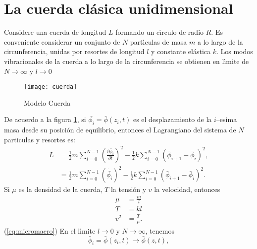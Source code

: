 
\section{La cuerda cl\'asica unidimensional}
\label{sec:la-cuerda-clasica}

\begin{frame}
Considere una cuerda de longitud $L$ formando un c\'\i rculo de radio $R$.
Es conveniente considerar un conjunto de $N$ part\'\i culas de masa $m$ a
lo largo de la circunferencia, unidas por resortes de longitud $l$ y
constante el\'astica $k$. Los modos vibracionales de la cuerda a lo
largo de la circunferencia se obtienen en l\'\i mite de $N\to\infty$ y $l\to0$ 

\begin{figure} %
  \centering %
  \texttt{[image: cuerda]} %
  \caption{Modelo Cuerda} %
  \label{fig:1string} %
\end{figure} %
De acuerdo a la figura 
\ref{fig:1string}, %
si $\bar{\phi_i}=\bar{\phi}(z_i,t)$ es el
desplazamiento de la $i$--esima masa desde su posici\'on de equilibrio,
entonces el Lagrangiano del sistema de $N$ particulas y resortes es:
\begin{align}
  \label{eq:1strLsum} %
  L&=\frac{1}{2}m\sum_{i=0}^{N-1}
  \left(
\frac{\partial\bar\phi_i}{\partial t}
  \right)^2-\frac{1}{2}k\sum_{i=0}^{N-1}
  \left(
\bar\phi_{i+1}-\bar\phi_{i}
  \right)^2,\\
  \label{eq:1strLsumdot} 
&=\frac{1}{2}m\sum_{i=0}^{N-1}
  \left(
    \dot{\bar{\phi_i}}
  \right)^2-\frac{1}{2}k\sum_{i=0}^{N-1}
  \left(
\bar\phi_{i+1}-\bar\phi_{i}
  \right)^2.
\end{align}
Si $\mu$ es la densidad de la cuerda, $T$ la tensi\'on y $v$ la velocidad, entonces
\begin{align}
  \label{eq:micromacro}
  \mu&=\frac{m}{l}\nonumber\\
  T&=kl\\
  v^2&=\frac{T}{\mu}.\nonumber
\end{align}
(\ref{eq:micromacro})
En el l\'\i mite $l\to0$ y $N\to\infty$, tenemos
\begin{equation}
  \label{eq:barf}
  \bar\phi_i=\bar\phi(z_i,t)\to\bar\phi(z,t),
\end{equation}

\end{frame}
